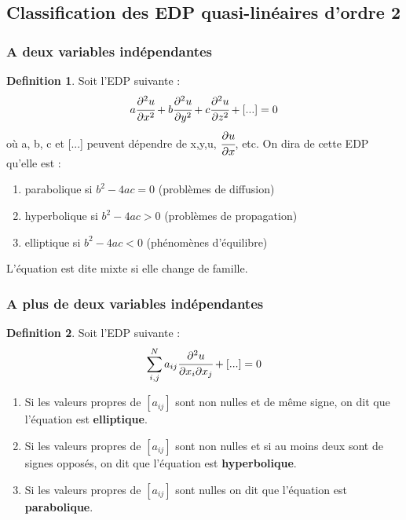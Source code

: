 \documentclass[french]{article}
\theoremstyle{definition}
\newtheorem{definition}{Definition}[section]
\begin{document}
\subsection{Classification des EDP quasi-linéaires d'ordre 2}
\subsubsection{A deux variables indépendantes}
\begin{definition}
	Soit l'EDP suivante :
	$$ a \cfrac{\partial^2u}{\partial x^2} + b \cfrac{\partial^2u}{\partial y^2} + c \cfrac{\partial^2u}{\partial z^2} + [...] = 0 $$
	où a, b, c et [...] peuvent dépendre de x,y,u, $\cfrac{\partial u}{\partial x}$, etc. On dira de cette EDP qu'elle est :
	\begin{enumerate}[label=\textbullet,topsep=5pt,parsep=0pt,itemsep=0pt,before=\vspace{-0.2\baselineskip},after=\vspace{0.1\baselineskip}] 
		\item parabolique si $b^2 - 4ac = 0$ (problèmes de diffusion)
		\item hyperbolique si $b^2 - 4ac > 0$ (problèmes de propagation)
		\item elliptique si $b^2 - 4ac < 0$ (phénomènes d'équilibre)
	\end{enumerate}
	L'équation est dite mixte si elle change de famille.
\end{definition}

\subsubsection{A plus de deux variables indépendantes}
\begin{definition}\par
	Soit l'EDP suivante :
	$$\sum_{i,j}^{N}a_{ij}\cfrac{\partial^2u}{\partial x_i \partial x_j} + [...] = 0$$
	\begin{enumerate}[label=\textbullet,topsep=5pt,parsep=0pt,itemsep=0pt,before=\vspace{-0.2\baselineskip},after=\vspace{0.1\baselineskip}] 
		\item Si les valeurs propres de $[a_{ij}]$ sont non nulles et de même signe, on dit que l'équation est \textbf{elliptique}.
		\item Si les valeurs propres de $[a_{ij}]$ sont non nulles et si au moins deux sont de signes opposés, on dit que l'équation est \textbf{hyperbolique}.
		\item Si les valeurs propres de $[a_{ij}]$ sont nulles on dit que l'équation est \textbf{parabolique}.
	\end{enumerate}
\end{definition}
\end{document}
